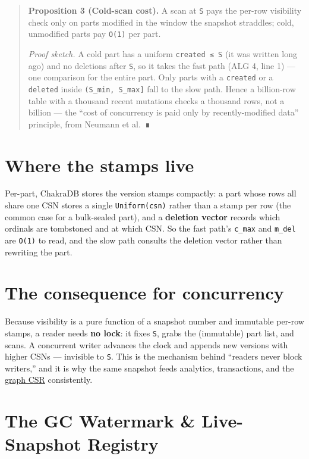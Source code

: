 \documentclass[
  11pt,
  openany]{book}
\begin{document}
\begin{quote}
\textbf{Proposition 3 (Cold-scan cost).} A scan at \texttt{S} pays the
per-row visibility check only on parts modified in the window the
snapshot straddles; cold, unmodified parts pay \texttt{O(1)} per part.

\emph{Proof sketch.} A cold part has a uniform \texttt{created\ ≤\ S}
(it was written long ago) and no deletions after \texttt{S}, so it takes
the fast path (ALG 4, line 1) --- one comparison for the entire part.
Only parts with a \texttt{created} or a \texttt{deleted} inside
\texttt{(S\_min,\ S\_max{]}} fall to the slow path. Hence a billion-row
table with a thousand recent mutations checks a thousand rows, not a
billion --- the ``cost of concurrency is paid only by recently-modified
data'' principle, from Neumann et al.~∎
\end{quote}

\section{Where the stamps live}\label{where-the-stamps-live}

Per-part, ChakraDB stores the version stamps compactly: a part whose
rows all share one CSN stores a single \texttt{Uniform(csn)} rather than
a stamp per row (the common case for a bulk-sealed part), and a
\textbf{deletion vector} records which ordinals are tombstoned and at
which CSN. So the fast path's \texttt{c\_max} and \texttt{m\_del} are
\texttt{O(1)} to read, and the slow path consults the deletion vector
rather than rewriting the part.

\section{The consequence for
concurrency}\label{the-consequence-for-concurrency}

Because visibility is a pure function of a snapshot number and immutable
per-row stamps, a reader needs \textbf{no lock}: it fixes \texttt{S},
grabs the (immutable) part list, and scans. A concurrent writer advances
the clock and appends new versions with higher CSNs --- invisible to
\texttt{S}. This is the mechanism behind ``readers never block
writers,'' and it is why the same snapshot feeds analytics,
transactions, and the \href{../graph/snapshot.md}{graph CSR}
consistently.

\section{The GC Watermark \& Live-Snapshot
Registry}\label{the-gc-watermark-live-snapshot-registry}
\end{document}

